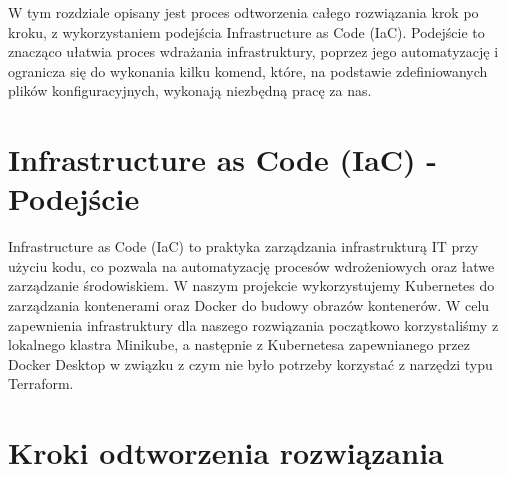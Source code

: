 \documentclass[polish]{aghengthesis}
\begin{document}
W tym rozdziale opisany jest proces odtworzenia całego rozwiązania krok po kroku, z wykorzystaniem podejścia Infrastructure as Code (IaC). Podejście to znacząco ułatwia proces wdrażania infrastruktury, poprzez jego automatyzację i ogranicza się do wykonania kilku komend, które, na podstawie zdefiniowanych plików konfiguracyjnych, wykonają niezbędną pracę za nas.

\section{Infrastructure as Code (IaC) - Podejście}

Infrastructure as Code (IaC) to praktyka zarządzania infrastrukturą IT przy użyciu kodu, co pozwala na automatyzację procesów wdrożeniowych oraz łatwe zarządzanie środowiskiem. W naszym projekcie wykorzystujemy Kubernetes do zarządzania kontenerami oraz Docker do budowy obrazów kontenerów. W celu zapewnienia infrastruktury dla naszego rozwiązania początkowo korzystaliśmy z lokalnego klastra Minikube, a następnie z Kubernetesa zapewnianego przez Docker Desktop w związku z czym nie było potrzeby korzystać z narzędzi typu Terraform.

\section{Kroki odtworzenia rozwiązania}
\end{document}
